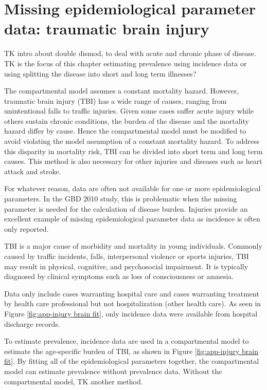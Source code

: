 \chapter{Missing epidemiological parameter data: traumatic brain injury}
\label{applications-double_dismod}

TK intro about double dismod, to deal with acute and chronic phase of disease.
TK is the focus of this chapter estimating prevalence using incidence data
or using splitting the disease into short and long term illnesses?

The compartmental model assumes a constant mortality hazard.
However, traumatic brain injury (TBI) has a wide range of
causes, ranging from unintentional falls to traffic injuries.
Given some cases suffer acute injury while others sustain
chronic conditions, the burden of the disease and the mortality hazard
differ by cause.  Hence the compartmental model must be modified
to avoid violating the model assumption of a
constant mortality hazard.  To address this disparity in mortality
risk, TBI can be divided into short term and long term
causes.  This method is also necessary for other injuries and
diseases such as heart attack and stroke.

For whatever reason, data are often not available for one or more
epidemiological parameters.  In the GBD 2010 study, this is
problematic when the missing parameter is needed for the calculation
of disease burden.  Injuries provide an excellent example of missing
epidemiological parameter data as incidence is often only reported.

TBI is a major cause of morbidity and
mortality in young individuals. Commonly caused by traffic
incidents, falls, interpersonal violence or sports injuries,
TBI may result in physical, cognitive, and psychosocial impairment.
It is typically diagnosed by clinical symptoms such as loss of
consciousness or amnesia. \cite{maas_moderate_2008, nih_rehabilitation_1999,
bruns_epidemiology_2003}

Data only include cases warranting hospital care and cases warranting
treatment by health care professional but not hospitalization (other
health care).  As seen in Figure \ref{fig:app-injury brain fit},
only incidence data were available from hospital discharge records.

To estimate prevalence, incidence data are used in a compartmental model to estimate the
age-specific burden of TBI, as shown in Figure
\ref{fig:app-injury brain fit}.  By fitting all of the epidemiological
parameters together, the compartmental model can estimate prevalence
without prevalence data.  Without the compartmental model, TK another method.

